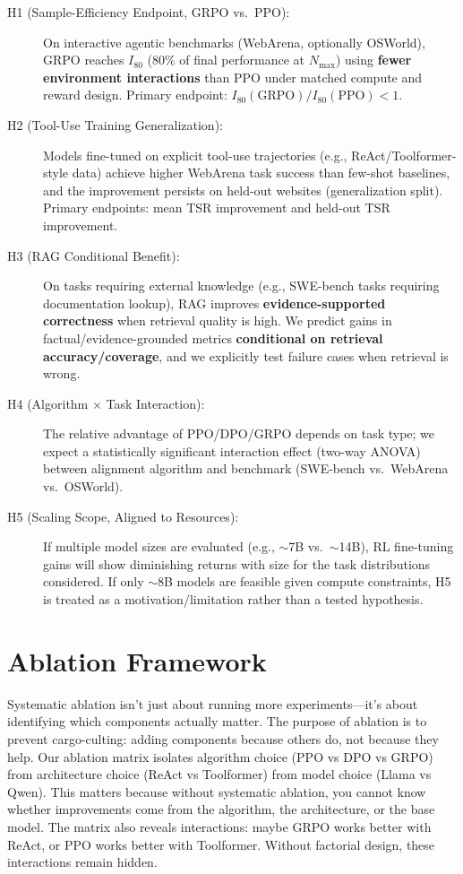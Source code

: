 \documentclass[12pt,a4paper]{report}
\theoremstyle{definition}
\begin{document}
\begin{description}
    \item[H1 (Sample-Efficiency Endpoint, GRPO vs.\ PPO):] On interactive agentic benchmarks (WebArena, optionally OSWorld), GRPO reaches $I_{80}$ (80\% of final performance at $N_{\max}$) using \textbf{fewer environment interactions} than PPO under matched compute and reward design. Primary endpoint: $I_{80}(\text{GRPO}) / I_{80}(\text{PPO}) < 1$.

    \item[H2 (Tool-Use Training Generalization):] Models fine-tuned on explicit tool-use trajectories (e.g., ReAct/Toolformer-style data) achieve higher WebArena task success than few-shot baselines, and the improvement persists on held-out websites (generalization split). Primary endpoints: mean TSR improvement and held-out TSR improvement.

    \item[H3 (RAG Conditional Benefit):] On tasks requiring external knowledge (e.g., SWE-bench tasks requiring documentation lookup), RAG improves \textbf{evidence-supported correctness} when retrieval quality is high. We predict gains in factual/evidence-grounded metrics \textbf{conditional on retrieval accuracy/coverage}, and we explicitly test failure cases when retrieval is wrong.

    \item[H4 (Algorithm $\times$ Task Interaction):] The relative advantage of PPO/DPO/GRPO depends on task type; we expect a statistically significant interaction effect (two-way ANOVA) between alignment algorithm and benchmark (SWE-bench vs.\ WebArena vs.\ OSWorld).

    \item[H5 (Scaling Scope, Aligned to Resources):] If multiple model sizes are evaluated (e.g., $\sim$7B vs.\ $\sim$14B), RL fine-tuning gains will show diminishing returns with size for the task distributions considered. If only $\sim$8B models are feasible given compute constraints, H5 is treated as a motivation/limitation rather than a tested hypothesis.
\end{description}

\section{Ablation Framework}
Systematic ablation isn't just about running more experiments—it's about identifying which components actually matter. The purpose of ablation is to prevent cargo-culting: adding components because others do, not because they help. Our ablation matrix isolates algorithm choice (PPO vs DPO vs GRPO) from architecture choice (ReAct vs Toolformer) from model choice (Llama vs Qwen). This matters because without systematic ablation, you cannot know whether improvements come from the algorithm, the architecture, or the base model. The matrix also reveals interactions: maybe GRPO works better with ReAct, or PPO works better with Toolformer. Without factorial design, these interactions remain hidden.
\end{document}
